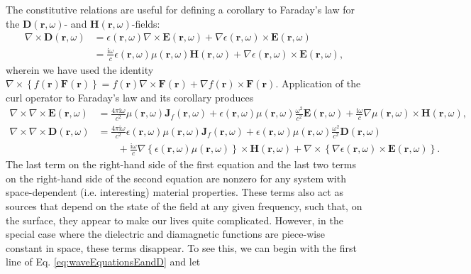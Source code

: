 \documentclass{article}
\begin{document}
The constitutive relations are useful for defining a corollary to Faraday's law for the $\mathbf{D}(\mathbf{r},\omega)$- and $\mathbf{H}(\mathbf{r},\omega)$-fields:
\begin{equation}
\begin{split}
\nabla\times\mathbf{D}(\mathbf{r},\omega) &= \epsilon(\mathbf{r},\omega)\nabla\times\mathbf{E}(\mathbf{r},\omega) + \nabla\epsilon(\mathbf{r},\omega)\times\mathbf{E}(\mathbf{r},\omega)\\
&= \frac{\mathrm{i}\omega}{c}\epsilon(\mathbf{r},\omega)\mu(\mathbf{r},\omega)\mathbf{H}(\mathbf{r},\omega) + \nabla\epsilon(\mathbf{r},\omega)\times\mathbf{E}(\mathbf{r},\omega),
\end{split}
\end{equation}
wherein we have used the identity $\nabla\times\left\{f(\mathbf{r})\mathbf{F}(\mathbf{r})\right\} = f(\mathbf{r})\nabla\times\mathbf{F}(\mathbf{r}) + \nabla f(\mathbf{r})\times\mathbf{F}(\mathbf{r})$. Application of the curl operator to Faraday's law and its corollary produces
\begin{equation}\label{eq:waveEquationsEandD}
\begin{split}
\nabla\times\nabla\times\mathbf{E}(\mathbf{r},\omega) &= \frac{4\pi\mathrm{i}\omega}{c^2}\mu(\mathbf{r},\omega)\mathbf{J}_f(\mathbf{r},\omega) + \epsilon(\mathbf{r},\omega)\mu(\mathbf{r},\omega)\frac{\omega^2}{c^2}\mathbf{E}(\mathbf{r},\omega) + \frac{\mathrm{i}\omega}{c}\nabla\mu(\mathbf{r},\omega)\times\mathbf{H}(\mathbf{r},\omega),\\
\nabla\times\nabla\times\mathbf{D}(\mathbf{r},\omega) &= \frac{4\pi\mathrm{i}\omega}{c^2}\epsilon(\mathbf{r},\omega)\mu(\mathbf{r},\omega)\mathbf{J}_f(\mathbf{r},\omega) + \epsilon(\mathbf{r},\omega)\mu(\mathbf{r},\omega)\frac{\omega^2}{c^2}\mathbf{D}(\mathbf{r},\omega)\\
&\qquad + \frac{\mathrm{i}\omega}{c}\nabla\left\{\epsilon(\mathbf{r},\omega)\mu(\mathbf{r},\omega)\right\}\times\mathbf{H}(\mathbf{r},\omega) + \nabla\times\left\{\nabla\epsilon(\mathbf{r},\omega)\times\mathbf{E}(\mathbf{r},\omega)\right\}.
\end{split}
\end{equation}
The last term on the right-hand side of the first equation and the last two terms on the right-hand side of the second equation are nonzero for any system with space-dependent (i.e. interesting) material properties. These terms also act as sources that depend on the state of the field at any given frequency, such that, on the surface, they appear to make our lives quite complicated. However, in the special case where the dielectric and diamagnetic functions are piece-wise constant in space, these terms disappear. To see this, we can begin with the first line of Eq. \eqref{eq:waveEquationsEandD} and let
\end{document}

